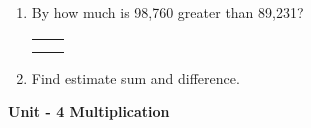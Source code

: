 \begin{enumerate}
    \begin{myTableStyle} \begin{tabular}{ |m{10cm}|m{3cm}| } \hline
        &  \\\hline
        &  \\\hline
        \multicolumn{2}{|c|}{} \\\hline
    \end{tabular} \end{myTableStyle} \vspace{0.08in}

    \item By how much is 98,760 greater than 89,231?

    \begin{myTableStyle} \begin{tabular}{ |m{10cm}|m{3cm}| } \hline
        &  \\\hline
        &  \\\hline
        \multicolumn{2}{|c|}{} \\\hline
    \end{tabular} \end{myTableStyle} \vspace{0.08in}

    \item Find estimate sum and difference.

\end{enumerate}

\newpage \centerline{\textbf{ \LARGE  Unit - 4 \quad Multiplication }}

